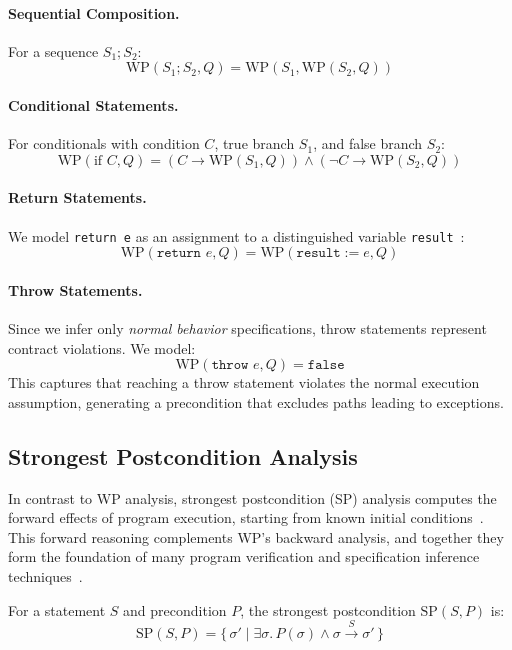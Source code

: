 \paragraph{Sequential Composition.}
For a sequence $S_1; S_2$:
\[
\text{WP}(S_1; S_2, Q) = \text{WP}(S_1, \text{WP}(S_2, Q))
\]

\paragraph{Conditional Statements.}
For conditionals with condition $C$, true branch $S_1$, and false branch $S_2$:
\[
\text{WP}(\text{if } C, Q) = (C \rightarrow \text{WP}(S_1, Q)) \land (\neg C \rightarrow \text{WP}(S_2, Q))
\]

\paragraph{Return Statements.}
We model \texttt{return e} as an assignment to a distinguished variable \texttt{result}~\cite{morgan_programming_1990}:
\[
\text{WP}(\texttt{return } e, Q) = \text{WP}(\texttt{result} := e, Q)
\]

\paragraph{Throw Statements.}
Since we infer only \emph{normal behavior} specifications, throw statements represent contract violations. We model:
\[
\text{WP}(\texttt{throw } e, Q) = \texttt{false}
\]
This captures that reaching a throw statement violates the normal execution assumption, generating a precondition that excludes paths leading to exceptions.

\subsection{Strongest Postcondition Analysis}
\label{subsec:sp-theory}

In contrast to WP analysis, strongest postcondition (SP) analysis computes the forward effects of program execution, starting from known initial conditions~\cite{hoare1969axiomatic}. This forward reasoning complements WP's backward analysis, and together they form the foundation of many program verification and specification inference techniques~\cite{cousot1977abstract, cousot2010gentle}.

\begin{definition}
For a statement $S$ and precondition $P$, the strongest postcondition $\text{SP}(S, P)$ is:
\[
\text{SP}(S, P) = \{\, \sigma' \mid \exists \sigma.\, P(\sigma) \land \sigma \xrightarrow{S} \sigma' \,\}
\]
\end{definition}

